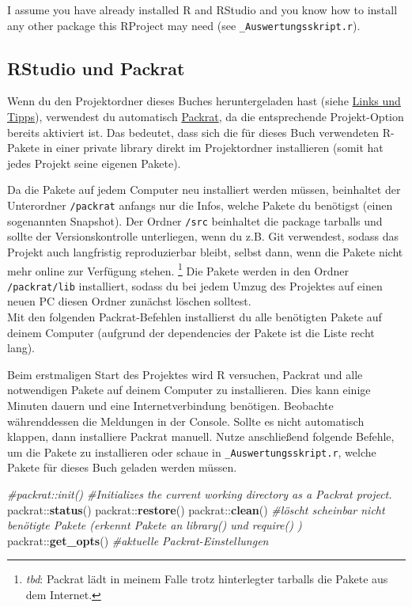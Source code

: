 \documentclass[]{book}
\makeatletter
\newenvironment{Shaded}{\begin{snugshade}}{\end{snugshade}}
\newcommand{\KeywordTok}[1]{\textcolor[rgb]{0.13,0.29,0.53}{\textbf{{#1}}}}
\newcommand{\CommentTok}[1]{\textcolor[rgb]{0.56,0.35,0.01}{\textit{{#1}}}}
\newcommand{\NormalTok}[1]{{#1}}
\let\rmarkdownfootnote\footnote%
\def\footnote{\protect\rmarkdownfootnote}
\newenvironment{kframe}{%
\medskip{}
\setlength{\fboxsep}{.8em}
 \def\at@end@of@kframe{}%
 \ifinner\ifhmode%
  \def\at@end@of@kframe{\end{minipage}}%
  \begin{minipage}{\columnwidth}%
 \fi\fi%
 \def\FrameCommand##1{\hskip\@totalleftmargin \hskip-\fboxsep
 \colorbox{shadecolor}{##1}\hskip-\fboxsep
     \hskip-\linewidth \hskip-\@totalleftmargin \hskip\columnwidth}%
 \MakeFramed {\advance\hsize-\width
   \@totalleftmargin\z@ \linewidth\hsize
   \@setminipage}}%
 {\par\unskip\endMakeFramed%
 \at@end@of@kframe}
\renewenvironment{Shaded}{\begin{kframe}}{\end{kframe}}
\theoremstyle{definition}
\theoremstyle{definition}
\theoremstyle{remark}
\let\BeginKnitrBlock\begin \let\EndKnitrBlock\end
\makeatother
\begin{document}
I assume you have already installed R and RStudio and you know how to
install any other package this RProject may need (see
\texttt{\_Auswertungsskript.r}).

\hypertarget{rstudio-und-packrat}{\subsection*{RStudio und
Packrat}\label{rstudio-und-packrat}}

Wenn du den Projektordner dieses Buches heruntergeladen hast (siehe
\protect\hyperlink{links-und-tipps}{Links und Tipps}), verwendest du
automatisch \href{https://rstudio.github.io/packrat/}{Packrat}, da die
entsprechende Projekt-Option bereits aktiviert ist. Das bedeutet, dass
sich die für dieses Buch verwendeten R-Pakete in einer private library
direkt im Projektordner installieren (somit hat jedes Projekt seine
eigenen Pakete).

Da die Pakete auf jedem Computer neu installiert werden müssen,
beinhaltet der Unterordner \texttt{/packrat} anfangs nur die Infos,
welche Pakete du benötigst (einen sogenannten Snapshot). Der Ordner
\texttt{/src} beinhaltet die package tarballs und sollte der
Versionskontrolle unterliegen, wenn du z.B. Git verwendest, sodass das
Projekt auch langfristig reproduzierbar bleibt, selbst dann, wenn die
Pakete nicht mehr online zur Verfügung stehen. \footnote{\emph{tbd}:
  Packrat lädt in meinem Falle trotz hinterlegter tarballs die Pakete
  aus dem Internet.} Die Pakete werden in den Ordner
\texttt{/packrat/lib} installiert, sodass du bei jedem Umzug des
Projektes auf einen neuen PC diesen Ordner zunächst löschen solltest.\\
Mit den folgenden Packrat-Befehlen installierst du alle benötigten
Pakete auf deinem Computer (aufgrund der dependencies der Pakete ist die
Liste recht lang).

\BeginKnitrBlock{rmdcaution}
Beim erstmaligen Start des Projektes wird R versuchen, Packrat und alle
notwendigen Pakete auf deinem Computer zu installieren. Dies kann einige
Minuten dauern und eine Internetverbindung benötigen. Beobachte
währenddessen die Meldungen in der Console. Sollte es nicht automatisch
klappen, dann installiere Packrat manuell. Nutze anschließend folgende
Befehle, um die Pakete zu installieren oder schaue in
\texttt{\_Auswertungsskript.r}, welche Pakete für dieses Buch geladen
werden müssen.
\EndKnitrBlock{rmdcaution}

\begin{Shaded}
\begin{Highlighting}[]
\CommentTok{#packrat::init()  #Initializes the current working directory as a Packrat project.}
\NormalTok{packrat::}\KeywordTok{status}\NormalTok{()}
\NormalTok{packrat::}\KeywordTok{restore}\NormalTok{()}
\NormalTok{packrat::}\KeywordTok{clean}\NormalTok{() }\CommentTok{#löscht scheinbar nicht benötigte Pakete (erkennt Pakete an library() und require() )}
\NormalTok{packrat::}\KeywordTok{get_opts}\NormalTok{()  }\CommentTok{#aktuelle Packrat-Einstellungen}
\end{Highlighting}
\end{Shaded}
\end{document}
